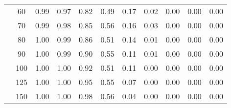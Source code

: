 \begin{table}[t]
\begin{center}
\begin{subtable}[c]{\textwidth}
\begin{center}
\begin{tabular}{rcccccccccc}
                                        & \multicolumn{1}{c|}{60}  & \num{0.99}  & \num{0.97}  & \num{0.82}  & \num{0.49}  & \num{0.17}  & \num{0.02}  & \num{0.00}  & \num{0.00}  & \num{0.00}  \\
                                        & \multicolumn{1}{c|}{70}  & \num{0.99}  & \num{0.98}  & \num{0.85}  & \num{0.56}  & \num{0.16}  & \num{0.03}  & \num{0.00}  & \num{0.00}  & \num{0.00}  \\
                                        & \multicolumn{1}{c|}{80}  & \num{1.00}  & \num{0.99}  & \num{0.86}  & \num{0.51}  & \num{0.14}  & \num{0.01}  & \num{0.00}  & \num{0.00}  & \num{0.00}  \\
                                        & \multicolumn{1}{c|}{90}  & \num{1.00}  & \num{0.99}  & \num{0.90}  & \num{0.55}  & \num{0.11}  & \num{0.01}  & \num{0.00}  & \num{0.00}  & \num{0.00}  \\
                                        & \multicolumn{1}{c|}{100}  & \num{1.00}  & \num{1.00}  & \num{0.92}  & \num{0.51}  & \num{0.11}  & \num{0.00}  & \num{0.00}  & \num{0.00}  & \num{0.00}  \\
                                        & \multicolumn{1}{c|}{125}  & \num{1.00}  & \num{1.00}  & \num{0.95}  & \num{0.55}  & \num{0.07}  & \num{0.00}  & \num{0.00}  & \num{0.00}  & \num{0.00}  \\
                                        & \multicolumn{1}{c|}{150}  & \num{1.00}  & \num{1.00}  & \num{0.98}  & \num{0.56}  & \num{0.04}  & \num{0.00}  & \num{0.00}  & \num{0.00}  & \num{0.00}  \\
                                    \end{tabular}
            \end{center}
        \end{subtable}

        \vspace{5mm}


\end{center}
\end{table}
